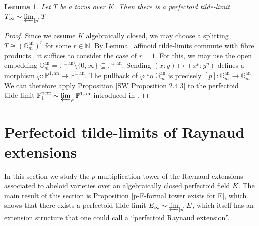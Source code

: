 \documentclass[10pt,oneside]{amsart}
\newtheorem{lemma}[theorem]{Lemma}
\theoremstyle{definition}
\newtheorem{remark}[theorem]{Remark}
\newcommand{\an}{\mathrm{an}}
\newcommand{\N}{\mathbb{N}}
\begin{document}
\begin{lemma}\label{l:tilde-limit-of-torus}
	Let $T$ be a torus over $K$. Then there is a perfectoid tilde-limit $T_\infty\sim \varprojlim_{[p]} T$.
\end{lemma}
\begin{proof}
Since we assume $K$ algebraically closed, we may choose a splitting $T\cong (\mathbb{G}_m^{\an})^r$ for some $r\in \N$. By Lemma~\ref{affinoid tilde-limits commute with fibre products}, it suffices to consider the case of $r=1$. For this, we may use the open embedding $\mathbb G_m^{\an}= \mathbb P^{1,\an}\setminus\{0, \infty\}\subseteq \mathbb P^{1,\an}$. Sending $(x:y)\mapsto (x^p:y^p)$ defines a morphism $\varphi:\mathbb P^{1,\an}\to \mathbb P^{1,\an}$. The pullback of $\varphi$ to $\mathbb G_m^{\an}$ is precisely $[p]:\mathbb G_m^{\an}\to \mathbb G_m^{\an}$. We can therefore apply Proposition \ref{SW Proposition 2.4.3} to the perfectoid tilde-limit $\mathbb P_1^{\text{perf}}\sim \varprojlim_{\varphi} \mathbb P^{1,\an}$ introduced in \cite[end of \S1]{perfectoid}. 
\end{proof}

			

	
 
	
 
	

	\section{Perfectoid tilde-limits of Raynaud extensions}\label{Raynaud extensions as principal bundles of formal and rigid spaces}
	In this section we study the $p$-multiplication tower of the Raynaud extensions associated to abeloid varieties over an algebraically closed perfectoid field $K$. The main result of this section is Proposition \ref{p-F-formal tower exists for E}, which shows that there exists a perfectoid tilde-limit $E_\infty \sim \varprojlim_{[p]} E$, which itself has an extension structure that one could call a ``perfectoid Raynaud extension''.  
	
\end{document}
